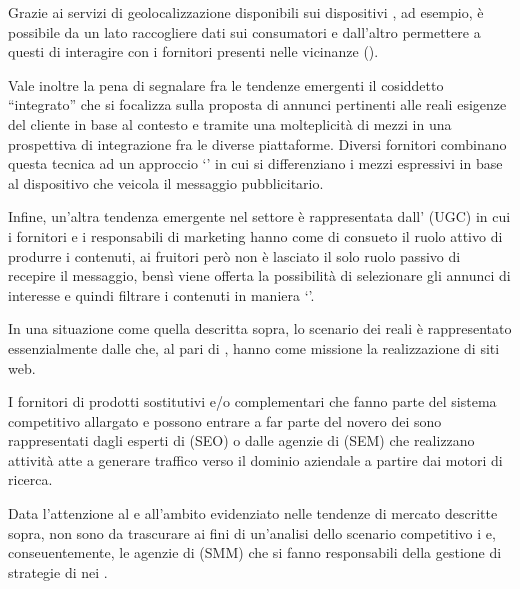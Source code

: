Grazie ai servizi di geolocalizzazione disponibili sui dispositivi , ad esempio, è possibile da un lato raccogliere dati sui consumatori e dall'altro permettere a questi di interagire con i fornitori presenti nelle vicinanze ().

Vale inoltre la pena di segnalare fra le tendenze emergenti il cosiddetto ``\mktg integrato'' che si focalizza sulla proposta di annunci pertinenti alle reali esigenze del cliente in base al contesto e tramite una molteplicità di mezzi in una prospettiva di integrazione fra le diverse piattaforme. Diversi fornitori combinano questa tecnica ad un approccio `' in cui si differenziano i mezzi espressivi in base al dispositivo che veicola il messaggio pubblicitario.

Infine, un'altra tendenza emergente nel settore è rappresentata dall' (UGC) in cui i fornitori e i responsabili di marketing hanno come di consueto il ruolo attivo di produrre i contenuti,  ai fruitori però non è lasciato il solo ruolo passivo di recepire il messaggio, bensì viene offerta la possibilità di selezionare gli annunci di interesse e quindi filtrare i contenuti in maniera `'.

In una situazione come quella descritta sopra, lo scenario dei  reali è rappresentato essenzialmente dalle  che, al pari di \customer, hanno come missione la realizzazione di siti web.

I fornitori di prodotti sostitutivi e/o complementari che fanno parte del sistema competitivo allargato e possono entrare a far parte del novero dei  sono rappresentati dagli esperti di  (SEO) o dalle agenzie di  (SEM) che realizzano attività atte a generare traffico verso il dominio aziendale a partire dai motori di ricerca.

Data l'attenzione al  e all'ambito  evidenziato nelle tendenze di mercato descritte sopra, non sono da trascurare ai fini di un'analisi dello scenario competitivo i  e, conseuentemente, le agenzie di  (SMM) che si fanno responsabili della gestione di strategie di \mktg nei .


